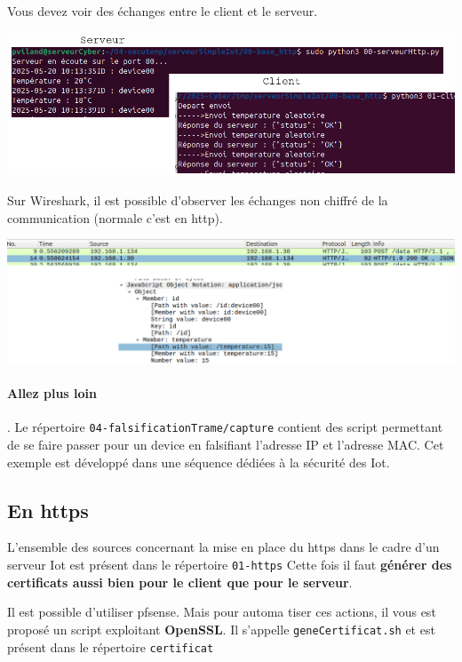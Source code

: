 \documentclass[french, 12pt]{article}%
\begin{document}
Vous devez voir des échanges entre le client et le serveur.
\begin{center}
\includegraphics[scale=0.5]{./ressource/exServeurIotHttp}
\end{center}

Sur Wireshark, il est possible d'observer les échanges non chiffré de la communication (normale c'est en http). 
\begin{center}
\includegraphics[scale=0.4]{./ressource/resWireshark}
\end{center}

\paragraph{Allez plus loin}. Le répertoire \verb?04-falsificationTrame/capture? contient des script permettant de se faire passer pour un device en falsifiant l'adresse IP et l'adresse MAC. Cet exemple est développé dans une séquence dédiées à la sécurité des Iot.

\subsection{En https}

L'ensemble des sources concernant la mise en place du https dans le cadre d'un serveur Iot est présent dans le répertoire \verb?01-https? Cette fois il faut \textbf{générer des certificats aussi bien pour le client que pour le serveur}.

\vspace{0.5cm}
Il est possible d'utiliser pfsense. Mais pour automa	tiser ces actions, il vous est proposé un script exploitant  \textbf{OpenSSL}. Il s'appelle \verb?geneCertificat.sh? et est présent dans le répertoire \verb?certificat?
\end{document}
